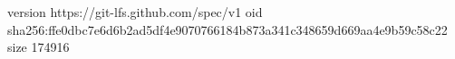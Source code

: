 version https://git-lfs.github.com/spec/v1
oid sha256:ffe0dbc7e6d6b2ad5df4e9070766184b873a341c348659d669aa4e9b59c58c22
size 174916
